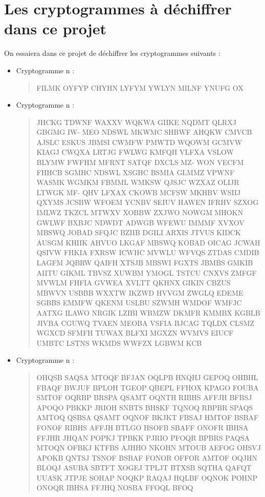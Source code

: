 \documentclass[a4paper, titlepage]{livret}
\begin{document}
\section{Les cryptogrammes à déchiffrer dans ce projet}

On essaiera dans ce projet de déchiffrer les cryptogrammes suivants :

\begin{itemize}

\item Cryptogramme n :
\begin{center}
\begin{quote}
\og FILMK OYFYP CHYHN LYFYM YWLYN MILNF YNUFG OX \fg{}
\end{quote}
\end{center}

\item Cryptogramme n :
\begin{center}
\begin{quote}
\og JHCKG TDWNF WAXXV WQKWA GIIKE NQDMT QLRXJ GBGMG IW-
MEO NDSWL MKWMC SHBWF AHQKW CMVCB AJSLC ESKUS JBMSI
CWMFW PMWTD WQOWM GCMVW KIAGJ CWQXA LRTJG FWLWG
KMFQH VLFXA VSLOW BLYMW FWFHM MFRNT SATQF DXCLS MZ-
WON VECFM FHHCB SGMHC NDSWL XSGHC BSMIA GLMMZ VPWNF
WASMK WGMKM FBMML WMKSW QJSJC WZXAZ OLIJR LTWGK MF-
QHV LFXAX CKOWB MCFSW MKHBV WSIIJ QXYMS JCSBW WFOEM
YCNBV SEIUV HAWEN IFRHV SZXOG IMLWZ TKZCL MTWXV XOBBW
ZXJWO NOWGM MHOKN GWLWF BXBJC NDWDT ADWGB WFEWU
IMMMF XVXOV MBSWQ JOBAD SFQJC BZIIB DGILI ARXIS JTVUS KIDCK
AUSGM KHIIK AHVUO LKGAF MBSWQ KOBAD OICAG JCWAH QSIVW
FHKIA FXRSW ICWHC MVWLU WFVQS ZTDAS CMDIB LAGFM JQBRW
QAIFH XTSJB MBSWI FGXTS JBMBS GMKIB AIITU GIKML TBVSZ XUWBM
YMOGL TSTCU CNXVS ZMFGF MVWLM FHFIA GVWEA XVLTT QKHNX
GIKIN CBZUS MBWVN USBBB WXXTW IKZWD HVVGM ZWGLQ EDEME
SGBBS EMMFW QKENM USLBU SZWMH WMDOF WMFJC AATXG ILAWO
NRGIK LZIBI WBMZW DKMFR KMMBX KGBLB JIVBA CGUWQ TVAEN
MEOBA VSFIA BJCAG TQLDX CLSMZ WGXCD SFMFH TUWAX BLFXI
MGXZN WVMVS EIUCF UMBTC LSTNS WKMDS WWFZX LGBWM KCB \fg{}
\end{quote}
\end{center}

\item Cryptogramme n :
\begin{center}
\begin{quote}
\og OHQSB SAQSA MTOQF BFJAN OQLPB HNQHJ GEPOQ OHBHL FBAQF BWJUF BPLOH TGEOP QBEPL FFHOX KPAGO FOUBA SMTOF OQRBP BRSPA QSAMT OQNTH RIBHS AFFJH BFBSJ APOQO PBKKP JRIOH SNBTS BHSKF TQNOQ RBPBR SPAQS AMTOQ QSBSA QSAMT OQNOF BKJKT FBSAJ HMTOF BSBAF FONOF RIBHS AFFJH BTLGO HSOFB SBAFF ONOFR IBHSA FFJHR JHQAN POPKJ TPBKK PJRIO PFOQR BPBRS PAQSA MTOQN OFBKJ KTFBS AJHHO NKOHN MTOUB AEFOG OHSVJ APOKB QNTSJ TSNOF BSBAF FONOR OFFOR AMTOF OQJHN BLOQJ ASUBA SBTFT XOGEJ TPLJT BTXSB SQTHA QAFQT UUASK JTPJE SOHAP NOQKP RAQAJ HQLBF OQNOK POHNP ONOQR IBHSA FFJHQ NOSBA FFOQL BFOQ \fg{}
\end{quote}
\end{center}

\end{itemize}
\end{document}

